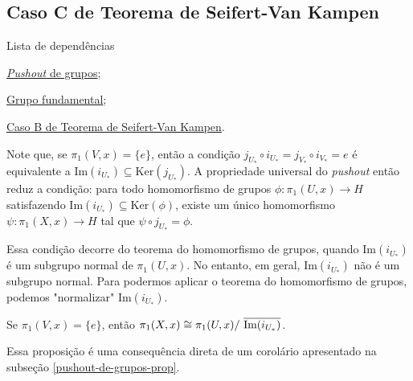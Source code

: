 \subsection{Caso C de Teorema de Seifert-Van Kampen} %
\label{teorema-s-vk-caso-c-prop}
\begin{titlemize}{Lista de dependências}
    \item \hyperref[pushout-de-grupos-prop]{\emph{Pushout} de grupos};\\
    \item \hyperref[grupo-fundamental]{Grupo fundamental};\\
    \item \hyperref[teorema-s-vk-caso-b-prop]{Caso B de Teorema de Seifert-Van Kampen}.
\end{titlemize}
Note que, se $\pi_1(V,x)=\{e\}$, então a condição $j_{U_*}\circ i_{U_*}=j_{V_*}\circ i_{V_*}= e$ é equivalente a $\text{Im}(i_{U_*})\subseteq \text{Ker}(j_{U_*})$. A propriedade universal do \emph{pushout} então reduz a condição: para todo homomorfismo de grupos $\phi:\pi_1(U,x)\rightarrow H$ satisfazendo $\text{Im}(i_{U_*})\subseteq \text{Ker}(\phi)$, existe um único homomorfismo $\psi:\pi_1(X,x)\rightarrow H$ tal que $\psi\circ j_{U_*}=\phi$.

Essa condição decorre do teorema do homomorfismo de grupos, quando $\text{Im}(i_{U_*})$ é um subgrupo normal de $\pi_1(U,x)$. No entanto, em geral, $\text{Im}(i_{U_*})$ não é um subgrupo normal. Para podermos aplicar o teorema do homomorfismo de grupos, podemos "normalizar" $\text{Im}(i_{U_*})$. 

\begin{prop}
    Se $\pi_1(V,x)=\{e\}$, então $\pi_1(X,x)\cong \pi_1(U,x)/\ \overline{\textnormal{Im}(i_{U_*})}$.
\end{prop}

\begin{dem}
    Essa proposição é uma consequência direta de um corolário apresentado na subseção \ref{pushout-de-grupos-prop}.
\end{dem}

